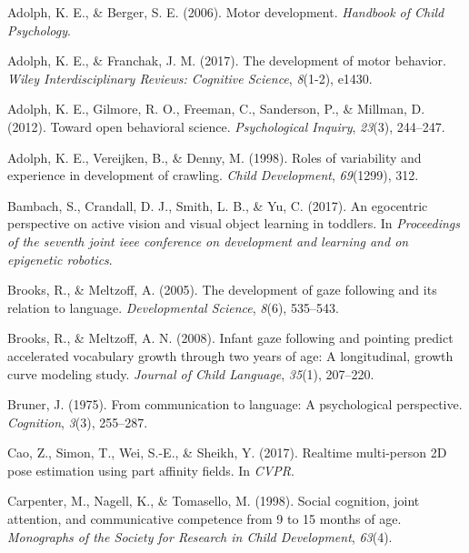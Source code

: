 \documentclass[english,man]{apa6}
\begin{document}
\begingroup
\setlength{\parindent}{-0.5in} \setlength{\leftskip}{0.5in}

\hypertarget{refs}{}
\hypertarget{ref-adolph2006motor}{}
Adolph, K. E., \& Berger, S. E. (2006). Motor development.
\emph{Handbook of Child Psychology}.

\hypertarget{ref-adolph2017development}{}
Adolph, K. E., \& Franchak, J. M. (2017). The development of motor
behavior. \emph{Wiley Interdisciplinary Reviews: Cognitive Science},
\emph{8}(1-2), e1430.

\hypertarget{ref-adolph2012toward}{}
Adolph, K. E., Gilmore, R. O., Freeman, C., Sanderson, P., \& Millman,
D. (2012). Toward open behavioral science. \emph{Psychological Inquiry},
\emph{23}(3), 244--247.

\hypertarget{ref-adolph1998roles}{}
Adolph, K. E., Vereijken, B., \& Denny, M. (1998). Roles of variability
and experience in development of crawling. \emph{Child Development},
\emph{69}(1299), 312.

\hypertarget{ref-bambach2017}{}
Bambach, S., Crandall, D. J., Smith, L. B., \& Yu, C. (2017). An
egocentric perspective on active vision and visual object learning in
toddlers. In \emph{Proceedings of the seventh joint ieee conference on
development and learning and on epigenetic robotics}.

\hypertarget{ref-brooks2005}{}
Brooks, R., \& Meltzoff, A. (2005). The development of gaze following
and its relation to language. \emph{Developmental Science}, \emph{8}(6),
535--543.

\hypertarget{ref-brooks2008}{}
Brooks, R., \& Meltzoff, A. N. (2008). Infant gaze following and
pointing predict accelerated vocabulary growth through two years of age:
A longitudinal, growth curve modeling study. \emph{Journal of Child
Language}, \emph{35}(1), 207--220.

\hypertarget{ref-bruner1975}{}
Bruner, J. (1975). From communication to language: A psychological
perspective. \emph{Cognition}, \emph{3}(3), 255--287.

\hypertarget{ref-cao2017realtime}{}
Cao, Z., Simon, T., Wei, S.-E., \& Sheikh, Y. (2017). Realtime
multi-person 2D pose estimation using part affinity fields. In
\emph{CVPR}.

\hypertarget{ref-carpenter1998}{}
Carpenter, M., Nagell, K., \& Tomasello, M. (1998). Social cognition,
joint attention, and communicative competence from 9 to 15 months of
age. \emph{Monographs of the Society for Research in Child Development},
\emph{63}(4).
\end{document}
